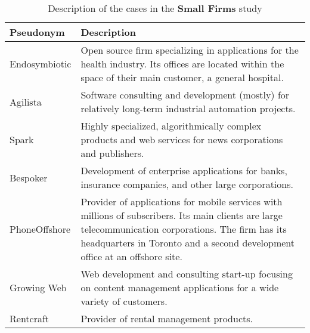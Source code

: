 \begin{table}[tbp]
\caption{\label{tab:SmallFirmsDescrip} Description of the cases in the \textbf{Small Firms} study}
\centering
\footnotesize{\begin{tabular}{p{2.4cm}p{11.2cm}}
\hline \hline
\vspace{1pt} \bfseries Pseudonym & \vspace{1pt} \bfseries Description \\
\hline
\vspace{0.5pt} Endosymbiotic & \vspace{0.5pt} Open source firm specializing in applications for the health industry. Its offices are located within the space of their main customer, a general hospital. \\
\hline
\vspace{0.5pt} Agilista & \vspace{0.5pt} Software consulting and development (mostly) for relatively long-term industrial automation projects. \\
\hline
\vspace{0.5pt}Spark & \vspace{0.5pt} Highly specialized, algorithmically complex products and web services for news corporations and publishers. \\
\hline
\vspace{0.5pt} Bespoker & \vspace{0.5pt} Development of enterprise applications for banks, insurance companies, and other large corporations. \\
\hline
\vspace{0.5pt}PhoneOffshore & \vspace{0.5pt} Provider of applications for mobile services with millions of subscribers. Its main clients are large telecommunication corporations. The firm has its headquarters in Toronto and a second development office at an offshore site. \\
\hline
\vspace{0.5pt}Growing Web & \vspace{0.5pt} Web development and consulting start-up focusing on content management applications for a wide variety of customers.\\
\hline
\vspace{0.5pt} Rentcraft & \vspace{0.5pt} Provider of rental management products. \\
\hline
\end{tabular}}
\end{table}

